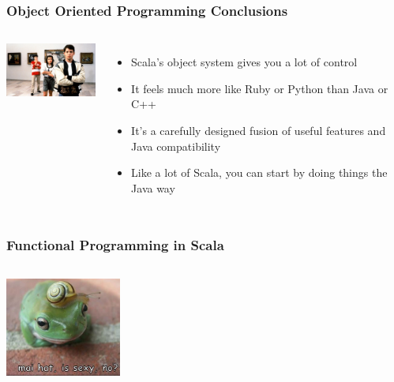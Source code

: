 \documentclass{beamer}
\begin{document}
\begin{frame} 
\frametitle{Object Oriented Programming Conclusions}
\begin{columns}[c]
  \column{1.0in}
    \includegraphics[width=1.5in]{graphics/ferris.jpg} 
  \column{2.0in}
    \begin{itemize}
      \item<1-> Scala's object system gives you a lot of control
      \item<2-> It feels much more like Ruby or Python than Java or C++
      \item<3-> It's a carefully designed fusion of useful features and Java compatibility
      \item<4-> Like a lot of Scala, you can start by doing things the Java way
    \end{itemize}
\end{columns}
\end{frame} 

\begin{frame} 
\frametitle{Functional Programming in Scala}
\begin{columns}[c]
  \column{1.0in}
    \includegraphics[width=1.5in]{graphics/hat.png} 
  \column{2.0in}
\end{columns}
\end{frame} 
\end{document}
